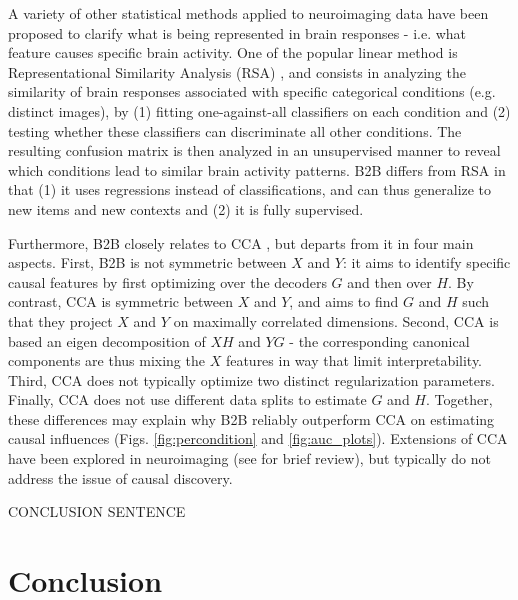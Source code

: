 \documentclass{article}
\begin{document}
A variety of other statistical methods applied to neuroimaging data have been proposed to clarify what is being represented in brain responses - i.e. what feature causes specific brain activity. One of the popular linear method is Representational Similarity Analysis (RSA) \citep{kriegeskorte2008representational}, and consists in analyzing the similarity of brain responses associated with specific categorical conditions (e.g. distinct images), by (1) fitting one-against-all classifiers on each condition and (2) testing whether these classifiers can discriminate all other conditions. The resulting confusion matrix is then analyzed in an unsupervised manner to reveal which conditions lead to similar brain activity patterns. B2B differs from RSA in that (1) it uses regressions instead of classifications, and can thus generalize to new items and new contexts and (2) it is fully supervised.

Furthermore, B2B closely relates to CCA \citep{cca_hotelling}, but departs from it in four main aspects. First, B2B is not symmetric between $X$ and $Y$: it aims to identify specific causal features by first optimizing over the decoders $G$ and then over $H$. By contrast, CCA is symmetric between $X$ and $Y$, and aims to find $G$ and $H$ such that they project $X$ and $Y$ on maximally correlated dimensions. Second, CCA is based an eigen decomposition of $XH$ and $YG$ - the corresponding canonical components are thus mixing the $X$ features in way that limit interpretability. Third, CCA does not typically optimize two distinct regularization parameters. Finally, CCA does not use different data splits to estimate $G$ and $H$. Together, these differences may explain why B2B reliably outperform CCA on estimating causal influences (Figs. \ref{fig:percondition} and \ref{fig:auc_plots}). Extensions of CCA have been explored in neuroimaging (see \citep{de2019multiway} for brief review), but typically do not address the issue of causal discovery.

CONCLUSION SENTENCE


\section{Conclusion}


\clearpage
\newpage




% 

%


\end{document}
